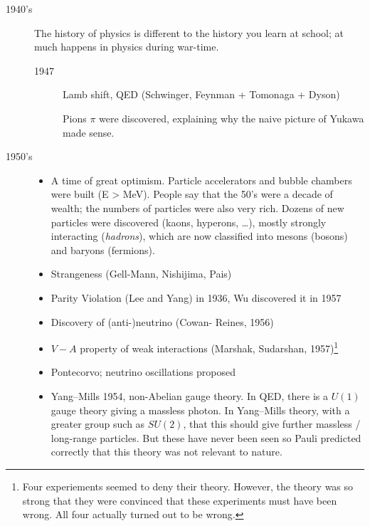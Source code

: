 \begin{description}
  \item[1940's] The history of physics is different to the history you learn at school; at much happens in physics during war-time.
    \begin{description}
      \item[1947] Lamb shift, QED (Schwinger, Feynman + Tomonaga + Dyson)\par Pions $\pi$ were discovered, explaining why the naive picture of Yukawa made sense.
    \end{description}
  \item[1950's] 
    \begin{itemize}
      \item A time of great optimism. Particle accelerators and bubble chambers were built (E > MeV).
    People say that the 50's were a decade of wealth; the numbers of particles were also very rich. Dozens of new particles were discovered (kaons, hyperons, \dots), mostly strongly interacting (\emph{hadrons}), which are now classified into mesons (bosons) and baryons (fermions).
    \item Strangeness (Gell-Mann, Nishijima, Pais)
    \item Parity Violation (Lee and Yang) in 1936, Wu discovered it in 1957
    \item Discovery of (anti-)neutrino (Cowan- Reines, 1956)
    \item $V-A$ property of weak interactions (Marshak, Sudarshan, 1957)\footnote{Four experiements seemed to deny their theory. However, the theory was so strong that they were convinced that these experiments must have been wrong. All four actually turned out to be wrong.}
    \item Pontecorvo; neutrino oscillations proposed
    \item Yang--Mills 1954, non-Abelian gauge theory.
      In QED, there is a $U(1)$ gauge theory giving a massless photon.
      In Yang--Mills theory, with a greater group such as $SU(2)$, that this should give further massless / long-range particles. But these have never been seen so Pauli predicted correctly that this theory was not relevant to nature.
    \end{itemize}

\end{description}
